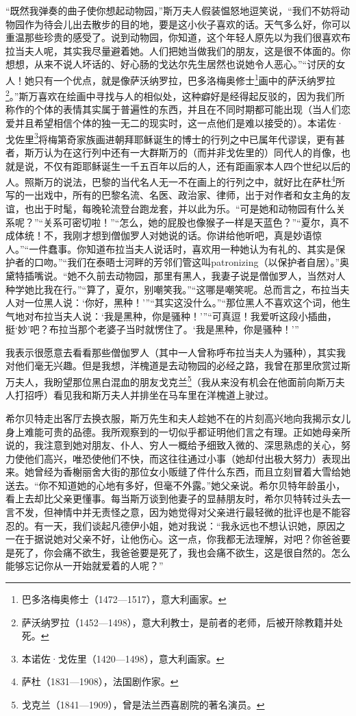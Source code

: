 \par “既然我弹奏的曲子使你想起动物园，”斯万夫人假装愠怒地逗笑说，“我们不妨将动物园作为待会儿出去散步的目的地，要是这小伙子喜欢的话。天气多么好，你可以重温那些珍贵的感受了。说到动物园，你知道，这个年轻人原先以为我们很喜欢布拉当夫人呢，其实我尽量避着她。人们把她当做我们的朋友，这是很不体面的。你想想，从来不说人坏话的、好心肠的戈达尔先生居然也说她令人恶心。”“讨厌的女人！她只有一个优点，就是像萨沃纳罗拉，巴多洛梅奥修士\footnote{巴多洛梅奥修士（1472—1517），意大利画家。}画中的萨沃纳罗拉\footnote{萨沃纳罗拉（1452—1498），意大利教士，是前者的老师，后被开除教籍并处死。}。”斯万喜欢在绘画中寻找与人的相似处，这种癖好是经得起反驳的，因为我们所称作的个体的表情其实属于普遍性的东西，并且在不同时期都可能出现（当人们恋爱并且希望相信个体的独一无二的现实时，这一点他们是难以接受的）。本诺佐·戈佐里\footnote{本诺佐·戈佐里（1420—1498），意大利画家。}将梅第奇家族画进朝拜耶稣诞生的博士的行列之中已属年代谬误，更有甚者，斯万认为在这行列中还有一大群斯万的（而并非戈佐里的）同代人的肖像，也就是说，不仅有距耶稣诞生一千五百年以后的人，还有距画家本人四个世纪以后的人。照斯万的说法，巴黎的当代名人无一不在画上的行列之中，就好比在萨杜\footnote{萨杜（1831—1908），法国剧作家。}所写的一出戏中，所有的巴黎名流、名医、政治家、律师，出于对作者和女主角的友谊，也出于时髦，每晚轮流登台跑龙套，并以此为乐。“可是她和动物园有什么关系呢？”“关系可密切啦！”“怎么，她的屁股也像猴子一样是天蓝色？”“夏尔，真不成体统！不，我刚才想到僧伽罗人对她说的话。你讲给他听吧，真是妙语惊人。”“一件蠢事。你知道布拉当夫人说话时，喜欢用一种她认为有礼的、其实是保护者的口吻。”“我们在泰晤士河畔的芳邻们管这叫patronizing（以保护者自居）。”奥黛特插嘴说。“她不久前去动物园，那里有黑人，我妻子说是僧伽罗人，当然对人种学她比我在行。”“算了，夏尔，别嘲笑我。”“这哪是嘲笑呢。总而言之，布拉当夫人对一位黑人说：‘你好，黑种！’”“其实这没什么。”“那位黑人不喜欢这个词，他生气地对布拉当夫人说：‘我是黑种，你是骚种！’”“可真逗！我爱听这段小插曲，挺‘妙’吧？布拉当那个老婆子当时就愣住了。‘我是黑种，你是骚种！’”
\par 我表示很愿意去看看那些僧伽罗人（其中一人曾称呼布拉当夫人为骚种），其实我对他们毫无兴趣。但是我想，洋槐道是去动物园的必经之路，我曾在那里欣赏过斯万夫人，我盼望那位黑白混血的朋友戈克兰\footnote{戈克兰（1841—1909），曾是法兰西喜剧院的著名演员。}（我从来没有机会在他面前向斯万夫人打招呼）看见我和斯万夫人并排坐在马车里在洋槐道上驶过。
\par 希尔贝特走出客厅去换衣服，斯万先生和夫人趁她不在的片刻高兴地向我揭示女儿身上难能可贵的品德。我所观察到的一切似乎都证明他们言之有理。正如她母亲所说的，我注意到她对朋友、仆人、穷人一概给予细致入微的、深思熟虑的关心，努力使他们高兴，唯恐使他们不快，而这往往通过小事（她却付出极大努力）表现出来。她曾经为香榭丽舍大街的那位女小贩缝了件什么东西，而且立刻冒着大雪给她送去。“你不知道她的心地有多好，但毫不外露。”她父亲说。希尔贝特年龄虽小，看上去却比父亲更懂事。每当斯万谈到他妻子的显赫朋友时，希尔贝特转过头去一言不发，但神情中并无责怪之意，因为她觉得对父亲进行最轻微的批评也是不能容忍的。有一天，我们谈起凡德伊小姐，她对我说：“我永远也不想认识她，原因之一在于据说她对父亲不好，让他伤心。这一点，你我都无法理解，对吧？你爸爸要是死了，你会痛不欲生，我爸爸要是死了，我也会痛不欲生，这是很自然的。怎么能够忘记你从一开始就爱着的人呢？”
